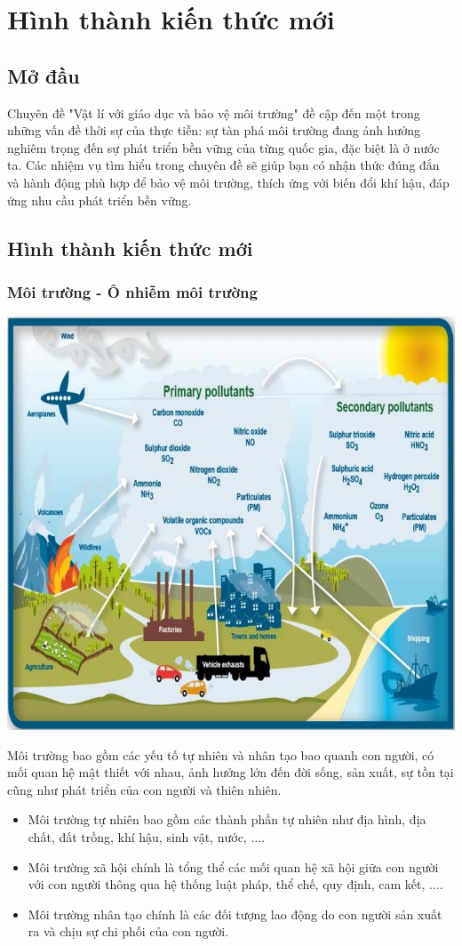 \setcounter{section}{0}
\section{Hình thành kiến thức mới}

\subsection{Mở đầu}
Chuyên đề "Vật lí với giáo dục và bảo vệ môi trường" đề cập đến một trong những vấn đề thời sự của thực tiễn: sự tàn phá môi trường đang ảnh hưởng nghiêm trọng đến sự phát triển bền vững của từng quốc gia, đặc biệt là ở nước ta. Các nhiệm vụ tìm hiểu trong chuyên đề sẽ giúp bạn có nhận thức đúng đắn và hành động phù hợp để bảo vệ môi trường, thích ứng với biến đổi khí hậu, đáp ứng nhu cầu phát triển bền vững.
\subsection{Hình thành kiến thức mới}

\subsubsection{Môi trường - Ô nhiễm môi trường}
\begin{center}
	\includegraphics[width=0.6\linewidth]{../figs/G10-036-2}
\end{center}
Môi trường bao gồm các yếu tố tự nhiên và nhân tạo bao quanh con người, có mối quan hệ mật thiết với nhau, ảnh hưởng lớn đến đời sống, sản xuất, sự tồn tại cũng như phát triển của con người và thiên nhiên.
\begin{itemize}
	\item Môi trường tự nhiên bao gồm các thành phần tự nhiên như địa hình, địa chất, đất trồng, khí hậu, sinh vật, nước, $\ldots$.
	\item Môi trường xã hội chính là tổng thể các mối quan hệ xã hội giữa con người với con người thông qua hệ thống luật pháp, thể chế, quy định, cam kết, $\ldots$.
	\item Môi trường nhân tạo chính là các đối tượng lao động do con người sản xuất ra và chịu sự chi phối của con người.
\end{itemize}

